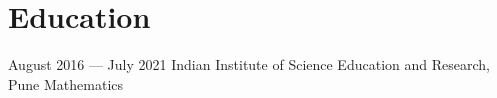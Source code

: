 
\section{Education}
\begin{itemize}[leftmargin=0in, label={}]
    {August 2016 --- July 2021}
    {Indian Institute of Science Education and Research, Pune}
    {Mathematics}
\end{itemize}
